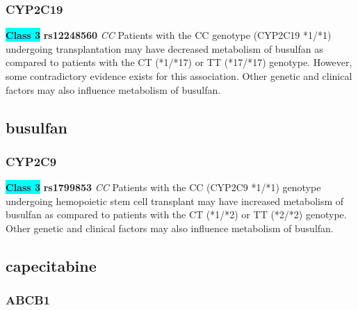 \documentclass{book}
\begin{document}
\subsubsection{ CYP2C19 }

\begin{center}
\textbf{\colorbox{cyan} {Class 3}} \textbf{ rs12248560 } \textit{ CC }
Patients with the CC genotype (CYP2C19 *1/*1) undergoing transplantation may have decreased metabolism of busulfan as compared to patients with the CT (*1/*17) or TT (*17/*17) genotype. However, some contradictory evidence exists for this association. Other genetic and clinical factors may also influence metabolism of busulfan.


\end{center}\subsection{ busulfan }


\subsubsection{ CYP2C9 }

\begin{center}
\textbf{\colorbox{cyan} {Class 3}} \textbf{ rs1799853 } \textit{ CC }
Patients with the CC (CYP2C9 *1/*1) genotype undergoing hemopoietic stem cell transplant may have increased metabolism of busulfan as compared to patients with the CT (*1/*2) or TT (*2/*2) genotype. Other genetic and clinical factors may also influence metabolism of busulfan.


\end{center}\subsection{ capecitabine }


\subsubsection{ ABCB1 }
\end{document}
